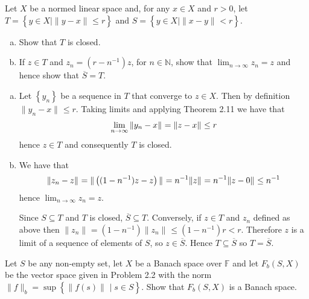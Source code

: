 \documentclass{homework}
\begin{document}
  \begin{problemtext}
    Let $X$ be a normed linear space and, for any $x \in X$ and $r >0$, let $T = \left\{ y \in X \mid \|y-x\|_{} \leq r \right\}$ and $S = \left\{ y \in X \mid \|x - y\|_{} < r \right\}$.
    \begin{enumerate}[a)]
      \item Show that $T$ is closed.
      \item If $z \in T$ and $z_n = \left( r-n^{-1} \right)z$, for $n \in
        \mathbb{N}$, show that $\lim_{n\to\infty} z_n = z$ and hence show that
        $\overline{S} = T$.
    \end{enumerate}
  \end{problemtext}
  \begin{solution}
    \begin{enumerate}[a)]\hfill
      \item Let $\left\{ y_n \right\}$ be a sequence in $T$ that converge to $z
        \in X$. Then by definition $\|y_n - x\|_{} \leq r$. Taking limits and
        applying Theorem 2.11 we have that
        \begin{equation}
          \notag
          \lim_{n\to\infty} \|y_n - x\|_{} = \|z - x\|_{} \leq r
        \end{equation}
        hence $z \in T$ and consequently $T$ is closed.
      \item We have that
      \begin{equation}
        \notag
        \|z_n - z\|_{} = \|\left( (1 - n^{-1})z - z \right)\|_{} =
        n^{-1}\|z\|_{} = n^{-1}\|z - 0\|_{} \leq n^{-1}
      \end{equation}
      hence $\lim_{n\to\infty} z_n = z$.

      Since $S \subseteq T$ and $T$ is closed, $\overline{S} \subseteq T$.
      Conversely, if $z \in T$ and $z_n$ defined as above then $\|z_n\|_{} =
      \left( 1 - n^{-1} \right)\|z_n\|_{} \leq (1 - n^{-1})r < r$. Therefore
      $z$ is a limit of a sequence of elements of $S$, so $z \in \overline{S}$.
      Hence $T \subseteq \overline{S}$ so $T = \overline{S}$.
    \end{enumerate}
  \end{solution}
  \begin{problemtext}
    Let $S$ be any non-empty set, let $X$ be a Banach space over $\mathbb{F}$
    and let $F_b(S, X)$ be the vector space given in Problem 2.2 with the norm
    $\|f\|_{b} = \sup \left\{ \|f(s)\|_{}\mid s \in S \right\}$. Show that
    $F_b(S, X)$ is a Banach space.
  \end{problemtext}
\end{document}

